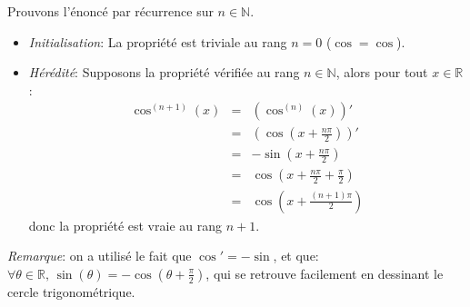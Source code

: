 Prouvons l’énoncé par récurrence sur $n\in\mathbb{N}$.
\begin{itemize} 
\item \textit{Initialisation}: La propriété est triviale au rang $n=0$ ($\cos=\cos$).\\
\item \textit{Hérédité}: Supposons la propriété vérifiée au rang $n\in\mathbb{N}$, alors pour tout $ x \in \mathbb{R}$:
\begin{eqnarray}
 \cos^{(n+1)}(x) &=& \left(\cos^{(n)}(x)\right)' \nonumber \\
  &=&  \left(\cos \left( x+\frac{n\pi}{2} \right) \right)' \nonumber \\
  &=&  -\sin \left( x+\frac{n\pi}{2} \right) \nonumber \\
  &=&  \cos \left( x+\frac{n\pi}{2} +\frac{\pi}{2}\right) \nonumber \\
  &=&  \cos \left( x+\frac{(n+1)\pi}{2}\right) \nonumber 
\end{eqnarray}
donc la propriété est vraie au rang $n+1$.
\end{itemize}
\textit{Remarque}: on a utilisé le fait que $\cos'=-\sin$, et que: $\forall \theta\in\mathbb{R}, \, \sin(\theta)=-\cos \left(\theta+\frac{\pi}{2}\right)$, qui se retrouve facilement en dessinant le cercle trigonométrique.

